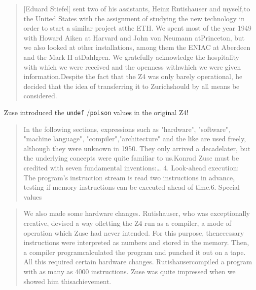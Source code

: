 \begin{quotation}
	[Eduard Stiefel] sent two of his assistants, Heinz Rutishauser and
	myself,to the United States with the assignment of studying the new technology
	in order to start a similar project atthe ETH. We spent most of the year 1949
	with Howard Aiken at Harvard and John von Neumann atPrinceton, but we also
	looked at other installations, among them the ENIAC at Aberdeen and the Mark II
	atDahlgren. We gratefully acknowledge the hospitality with which we were
	received and the openness withwhich we were given information.Despite the fact
	that the Z4 was only barely operational, he decided that the idea of
	transferring it to Zurichshould by all means be considered.\end{quotation}
Zuse introduced the \texttt{undef}
/\texttt{poison}
values in the original Z4!
\begin{quotation}
	In the following sections, expressions such as "hardware", "software", "machine
	language", "compiler","architecture" and the like are used freely, although
	they were unknown in 1950. They only arrived a decadelater, but the underlying
	concepts were quite familiar to us.Konrad Zuse must be credited with seven
	fundamental inventions:\dots
	4. Look-ahead execution: The program's instruction stream is read two
	instructions in advance, testing if memory instructions can be executed ahead
	of time.6. Special values
\end{quotation}
\begin{quotation}
	We also made some hardware changes. Rutishauser, who was exceptionally
	creative, devised a way ofletting the Z4 run as a compiler, a mode of operation
	which Zuse had never intended. For this purpose, thenecessary instructions were
	interpreted as numbers and stored in the memory. Then, a compiler
	programcalculated the program and punched it out on a tape. All this required
	certain hardware changes. Rutishausercompiled a program with as many as 4000
	instructions. Zuse was quite impressed when we showed him
	thisachievement.
\end{quotation}
